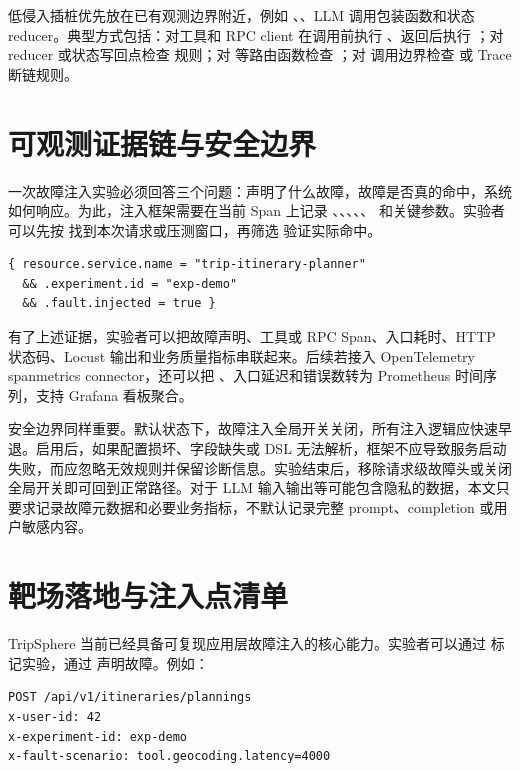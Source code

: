 低侵入插桩优先放在已有观测边界附近，例如 、、LLM 调用包装函数和状态 reducer。典型方式包括：对工具和 RPC client 在调用前执行 、返回后执行 ；对 reducer 或状态写回点检查  规则；对  等路由函数检查 ；对  调用边界检查  或 Trace 断链规则。

\section{可观测证据链与安全边界}

一次故障注入实验必须回答三个问题：声明了什么故障，故障是否真的命中，系统如何响应。为此，注入框架需要在当前 Span 上记录 、、、、、 和关键参数。实验者可以先按  找到本次请求或压测窗口，再筛选  验证实际命中。

\begin{verbatim}
{ resource.service.name = "trip-itinerary-planner"
  && .experiment.id = "exp-demo"
  && .fault.injected = true }
\end{verbatim}

有了上述证据，实验者可以把故障声明、工具或 RPC Span、入口耗时、HTTP 状态码、Locust 输出和业务质量指标串联起来。后续若接入 OpenTelemetry spanmetrics connector，还可以把 、入口延迟和错误数转为 Prometheus 时间序列，支持 Grafana 看板聚合。

安全边界同样重要。默认状态下，故障注入全局开关关闭，所有注入逻辑应快速早退。启用后，如果配置损坏、字段缺失或 DSL 无法解析，框架不应导致服务启动失败，而应忽略无效规则并保留诊断信息。实验结束后，移除请求级故障头或关闭全局开关即可回到正常路径。对于 LLM 输入输出等可能包含隐私的数据，本文只要求记录故障元数据和必要业务指标，不默认记录完整 prompt、completion 或用户敏感内容。

\section{靶场落地与注入点清单}

TripSphere 当前已经具备可复现应用层故障注入的核心能力。实验者可以通过  标记实验，通过  声明故障。例如：

\begin{verbatim}
POST /api/v1/itineraries/plannings
x-user-id: 42
x-experiment-id: exp-demo
x-fault-scenario: tool.geocoding.latency=4000
\end{verbatim}


